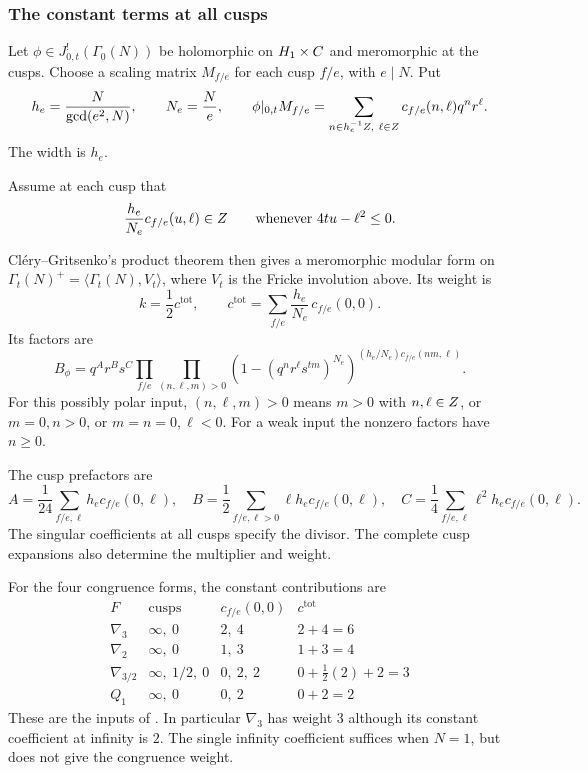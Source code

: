 \subsubsection{The constant terms at all cusps}
Let \(\phi\in J_{0,t}^{!}(\Gamma_0(N))\) be holomorphic on
\(H_1\times C\) and meromorphic at the cusps.
Choose a scaling matrix \(M_{f/e}\) for each cusp \(f/e\),
with \(e\mid N\).
Put
\[
 h_e=\frac{N}{\gcd(e^2,N)},\qquad N_e=\frac Ne,\qquad
 \phi|_{0,t}M_{f/e}
 =\sum_{n\in h_e^{-1}Z,\ \ell\in Z}
             c_{f/e}(n,\ell)q^nr^\ell.
\]
The width is \(h_e\).

Assume at each cusp that
\[
 \frac{h_e}{N_e}c_{f/e}(u,\ell)\in Z
 \qquad\text{whenever }4tu-\ell^2\leq0.
\]

Cl\'ery--Gritsenko's product theorem \cite[Theorem 3.1]{GC}
then gives a meromorphic modular form on
\(\Gamma_t(N)^+=\langle\Gamma_t(N),V_t\rangle\), where
\(V_t\) is the Fricke involution above.
Its weight is
\[
 k=\frac12c^{\mathrm{tot}},\qquad
 c^{\mathrm{tot}}
 =\sum_{f/e}\frac{h_e}{N_e}\,c_{f/e}(0,0).
\]
Its factors are
\[
 B_\phi=q^Ar^Bs^C
 \prod_{f/e}\prod_{(n,\ell,m)>0}
 \left(1-(q^nr^\ell s^{tm})^{N_e}\right)^{
               (h_e/N_e)c_{f/e}(nm,\ell)}.
\]
For this possibly polar input, \((n,\ell,m)>0\) means
\(m>0\) with \(n,\ell\in Z\), or \(m=0,n>0\), or
\(m=n=0,\ell<0\).  For a weak input the nonzero factors have
\(n\geq0\).

The cusp prefactors are
\[
 A=\frac1{24}\sum_{f/e,\ell}h_e c_{f/e}(0,\ell),\quad
 B=\frac12\sum_{f/e,\ell>0}\ell h_e c_{f/e}(0,\ell),\quad
 C=\frac14\sum_{f/e,\ell}\ell^2 h_e c_{f/e}(0,\ell).
\]
The singular coefficients at all cusps specify the divisor.
The complete cusp expansions also determine the multiplier and weight.

For the four congruence forms, the constant contributions are
\[
\begin{array}{c|c|c|c}
 F&\text{cusps}&c_{f/e}(0,0)&c^{\mathrm{tot}}\\ \hline
 \nabla_3&\infty,\ 0&2,\ 4&2+4=6\\
 \nabla_2&\infty,\ 0&1,\ 3&1+3=4\\
 \nabla_{3/2}&\infty,\ 1/2,\ 0&0,\ 2,\ 2&0+\tfrac12(2)+2=3\\
 Q_1&\infty,\ 0&0,\ 2&0+2=2
\end{array}
\]
These are the inputs of \cite[\S3]{GC}.
In particular \(\nabla_3\) has weight \(3\) although its
constant coefficient at infinity is \(2\).
The single infinity coefficient suffices when \(N=1\), but does
not give the congruence weight.


